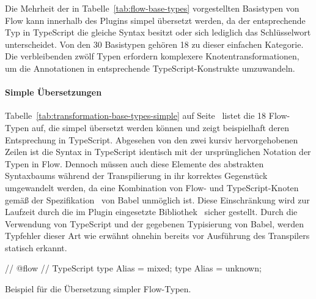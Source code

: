 {Die Mehrheit der in Tabelle~\ref{tab:flow-base-types} vorgestellten Basistypen von Flow kann innerhalb des Plugins simpel übersetzt werden, da der entsprechende Typ in TypeScript die gleiche Syntax besitzt oder sich lediglich das Schlüsselwort unterscheidet. Von den 30 Basistypen gehören 18 zu dieser einfachen Kategorie. Die verbleibenden zwölf Typen erfordern komplexere Knotentransformationen, um die Annotationen in entsprechende TypeScript-Konstrukte umzuwandeln.

\paragraph{Simple Übersetzungen}

Tabelle~\ref{tab:transformation-base-types-simple} auf Seite~\pageref{tab:transformation-base-types-simple} listet die 18 Flow-Typen auf, die simpel übersetzt werden können und zeigt beispielhaft deren Entsprechung in TypeScript. Abgesehen von den zwei kursiv hervorgehobenen Zeilen ist die Syntax in TypeScript identisch mit der ursprünglichen Notation der Typen in Flow. Dennoch müssen auch diese Elemente des abstrakten Syntaxbaums während der Transpilierung in ihr korrektes Gegenstück umgewandelt werden, da eine Kombination von Flow- und TypeScript-Knoten gemäß der Spezifikation~\autocite{BABEL:PARSER_SPEC} von Babel unmöglich ist. Diese Einschränkung wird zur Laufzeit durch die im Plugin eingesetzte Bibliothek \,\autocite{BABEL:TYPES} sicher gestellt. Durch die Verwendung von TypeScript und der gegebenen Typisierung von Babel, werden Typfehler dieser Art wie erwähnt ohnehin bereits vor Ausführung des Transpilers statisch erkannt.

\bigbreak


\bigbreak
\begin{listing}[htb]
\begin{textcode}
// @flow                              // TypeScript
type Alias = mixed;                  type Alias = unknown;
\end{textcode}
\listingvspace
\caption{Beispiel für die Übersetzung simpler Flow-Typen.}
\label{code:example-simple}
\end{listing}

}

